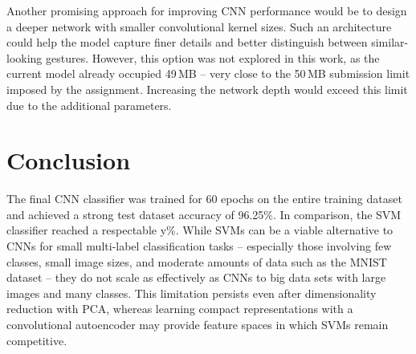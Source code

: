 \documentclass[a4, 10 pt, conference]{ieeeconf}  %
\begin{document}
Another promising approach for improving CNN performance would be to design a deeper network with smaller convolutional kernel sizes. Such an architecture could help the model capture finer details and better distinguish between similar-looking gestures. However, this option was not explored in this work, as the current model already occupied 49\,MB -- very close to the 50\,MB submission limit imposed by the assignment. Increasing the network depth would exceed this limit due to the additional parameters.


\section{Conclusion}
\label{sec:con}

The final CNN classifier was trained for 60 epochs on the entire training 
dataset and achieved a strong test dataset accuracy of 96.25\%. In comparison, 
the SVM classifier reached a respectable y\%. While SVMs can be a viable 
alternative to CNNs for small multi-label classification tasks -- especially 
those involving few classes, small image sizes, and moderate amounts of 
data such as the MNIST dataset -- they do not scale as effectively as CNNs 
to big data sets with large images and many classes. This limitation persists even after 
dimensionality reduction with PCA, whereas learning compact representations 
with a convolutional autoencoder may provide feature spaces in which SVMs remain competitive.


\end{document}
